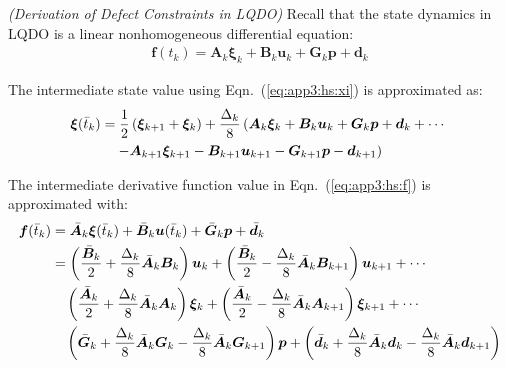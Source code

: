 \noindent \textit{(Derivation of Defect Constraints in LQDO)} Recall that the state dynamics in LQDO is a linear nonhomogeneous differential equation:
\begin{align}
\bm{f}(t_k) = \bm{A}_k\bm{\xi}_k + \bm{B}_k \bm{u}_k + \bm{G}_k\bm{p} + \bm{d}_k
\end{align}

\noindent The intermediate state value using Eqn.~(\ref{eq:app3:hs:xi}) is approximated as:
\begin{align}
\bm{\xi}(\bar{t}_k) &= \frac{1}{2}\left( \bm{\xi}_{k+1} + \bm{\xi}_k  \right) + \frac{\Delta_k}{8}\left(\bm{A}_k\bm{\xi}_k + \bm{B}_k \bm{u}_k + \bm{G}_k\bm{p} + \bm{d}_k+ \cdots \right. \\
& \quad \left. - \bm{A}_{k+1}\bm{\xi}_{k+1} - \bm{B}_{k+1} \bm{u}_{k+1} - \bm{G}_{k+1}\bm{p} - \bm{d}_{k+1} \right) \notag
\end{align}

\noindent The intermediate derivative function value in Eqn.~(\ref{eq:app3:hs:f}) is approximated with:
\begin{subequations}
\begin{align}
\bm{f}(\bar{t}_k) &= \bar{\bm{A}}_k\bm{\xi}(\bar{t}_k) + \bar{\bm{B}}_k \bm{u}(\bar{t}_k) + \bar{\bm{G}}_k\bm{p} + \bar{\bm{d}}_k \\
&=  \left( \frac{\bar{\bm{B}}_k}{2} + \frac{\Delta_k}{8}\bar{\bm{A}}_k \bm{B}_{k} \right) \bm{u}_{k} + \left( \frac{\bar{\bm{B}}_k}{2} - \frac{\Delta_k}{8}\bar{\bm{A}}_k \bm{B}_{k+1} \right) \bm{u}_{k+1} + \cdots \notag \\
& \quad \left( \frac{\bar{\bm{A}}_k}{2} + \frac{\Delta_k}{8} \bar{\bm{A}}_k \bm{A}_k \right) \bm{\xi}_{k} + \left( \frac{\bar{\bm{A}}_k}{2} - \frac{\Delta_k}{8} \bar{\bm{A}}_k \bm{A}_{k+1} \right) \bm{\xi}_{k+1} + \cdots  \notag \\
& \quad \left( \bar{\bm{G}}_k + \frac{\Delta_k}{8}\bar{\bm{A}}_k\bm{G}_k - \frac{\Delta_k}{8}\bar{\bm{A}}_k\bm{G}_{k+1} \right) \bm{p} + \left( \bar{\bm{d}}_k + \frac{\Delta_k}{8}\bar{\bm{A}}_k \bm{d}_k - \frac{\Delta_k}{8}\bar{\bm{A}}_k \bm{d}_{k+1} \right)
\end{align}
\end{subequations}

